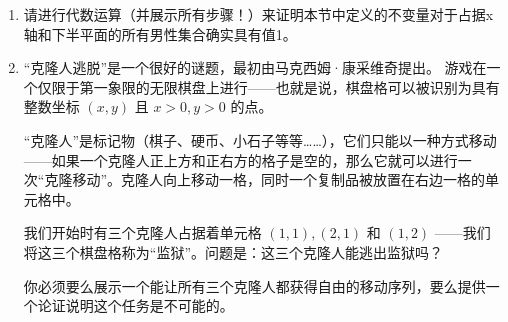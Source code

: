 \begin{enumerate}
    \item 请进行代数运算（并展示所有步骤！）来证明本节中定义的不变量对于占据x轴和下半平面的所有男性集合确实具有值1。
    \wbvfill
    
    \workbookpagebreak
    
    \item “克隆人逃脱”是一个很好的谜题，最初由马克西姆·康采维奇提出。
        游戏在一个仅限于第一象限的无限棋盘上进行——也就是说，棋盘格可以被识别为具有整数坐标 $(x,y)$ 且 $x>0, y>0$ 的点。

    \noindent “克隆人”是标记物（棋子、硬币、小石子等等……），它们只能以一种方式移动——如果一个克隆人正上方和正右方的格子是空的，那么它就可以进行一次“克隆移动”。克隆人向上移动一格，同时一个复制品被放置在右边一格的单元格中。

    我们开始时有三个克隆人占据着单元格 $(1,1), (2,1)$ 和 $(1,2)$ ——我们将这三个棋盘格称为“监狱”。问题是：这三个克隆人能逃出监狱吗？

    你必须要么展示一个能让所有三个克隆人都获得自由的移动序列，要么提供一个论证说明这个任务是不可能的。
    \wbvfill
    
    \end{enumerate}
    
